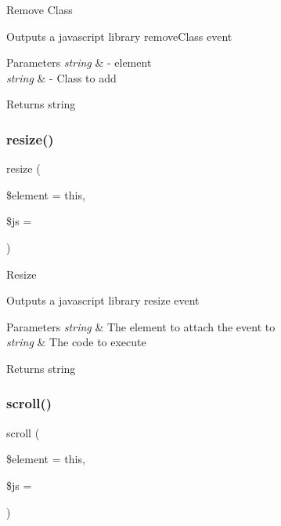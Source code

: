 Remove Class

Outputs a javascript library remove\+Class event


\begin{DoxyParams}{Parameters}
{\em string} & -\/ element \\
\hline
{\em string} & -\/ Class to add \\
\hline
\end{DoxyParams}
\begin{DoxyReturn}{Returns}
string 
\end{DoxyReturn}
\mbox{\label{class_c_i___javascript_a972b62f88e96fb29b179469e0d49329a}} 
\subsubsection{\texorpdfstring{resize()}{resize()}}
{\footnotesize\ttfamily resize (\begin{DoxyParamCaption}\item[{}]{\$element = {\ttfamily \textquotesingle{}this\textquotesingle{}},  }\item[{}]{\$js = {\ttfamily \textquotesingle{}\textquotesingle{}} }\end{DoxyParamCaption})}

Resize

Outputs a javascript library resize event


\begin{DoxyParams}{Parameters}
{\em string} & The element to attach the event to \\
\hline
{\em string} & The code to execute \\
\hline
\end{DoxyParams}
\begin{DoxyReturn}{Returns}
string 
\end{DoxyReturn}
\mbox{\label{class_c_i___javascript_acb749f777082c90c2b46eb1c367522dc}} 
\subsubsection{\texorpdfstring{scroll()}{scroll()}}
{\footnotesize\ttfamily scroll (\begin{DoxyParamCaption}\item[{}]{\$element = {\ttfamily \textquotesingle{}this\textquotesingle{}},  }\item[{}]{\$js = {\ttfamily \textquotesingle{}\textquotesingle{}} }\end{DoxyParamCaption})}

